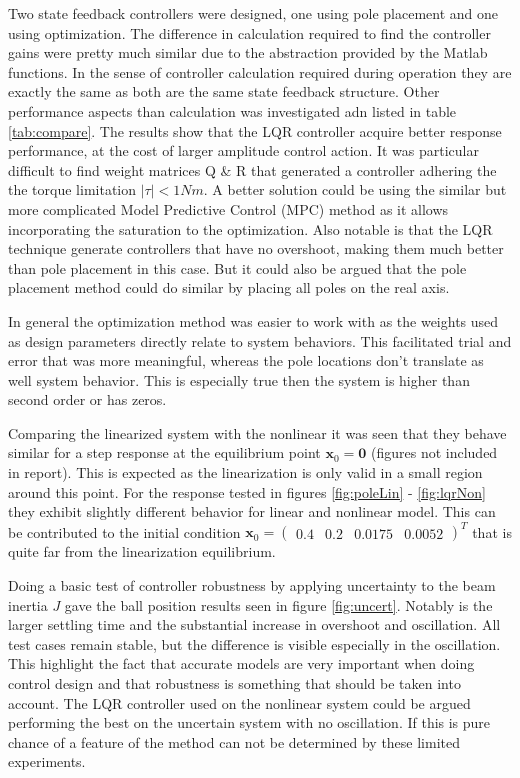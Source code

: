 \documentclass[a4paper, titlepage]{article}
\begin{document}
Two state feedback controllers were designed, one using pole placement and one using optimization.
The difference in calculation required to find the controller gains were pretty much similar due to the abstraction provided by the Matlab functions.
In the sense of controller calculation required during operation they are exactly the same as both are the same state feedback structure.
Other performance aspects than calculation was investigated adn listed in table \ref{tab:compare}.
The results show that the LQR controller acquire better response performance, at the cost of larger amplitude control action.
It was particular difficult to find weight matrices Q \& R that generated a controller adhering the the torque limitation $|\tau| < 1Nm$.
A better solution could be using the similar but more complicated Model Predictive Control (MPC) method as it allows incorporating the saturation to the optimization.
Also notable is that the LQR technique generate controllers that have no overshoot, making them much better than pole placement in this case.
But it could also be argued that the pole placement method could do similar by placing all poles on the real axis.

In general the optimization method was easier to work with as the weights used as design parameters directly relate to system behaviors.
This facilitated trial and error that was more meaningful, whereas the pole locations don't translate as well system behavior.
This is especially true then the system is higher than second order or has zeros.

Comparing the linearized system with the nonlinear it was seen that they behave similar for a step response at the equilibrium point $\textbf{x}_0 = \textbf{0}$ (figures not included in report).
This is expected as the linearization is only valid in a small region around this point.
For the response tested in figures \ref{fig:poleLin} - \ref{fig:lqrNon} they exhibit slightly different behavior for linear and nonlinear model.
This can be contributed to the initial condition $\textbf{x}_0 = \begin{pmatrix} 0.4 & 0.2 & 0.0175 & 0.0052 \end{pmatrix}^T$ that is quite far from the linearization equilibrium.

Doing a basic test of controller robustness by applying uncertainty to the beam inertia $J$ gave the ball position results seen in figure \ref{fig:uncert}.
Notably is the larger settling time and the substantial increase in overshoot and oscillation.
All test cases remain stable, but the difference is visible especially in the oscillation.
This highlight the fact that accurate models are very important when doing control design and that robustness is something that should be taken into account.
The LQR controller used on the nonlinear system could be argued performing the best on the uncertain system with no oscillation.
If this is pure chance of a feature of the method can not be determined by these limited experiments.
\end{document}
